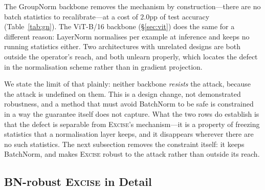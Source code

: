 \documentclass{article}
\newcommand{\ours}{\textsc{Excise}}
\newcommand{\added}[1]{{\color{revised}#1}}
\theoremstyle{remark}
\theoremstyle{plain}
\begin{document}
The GroupNorm backbone removes the mechanism by construction---there are no batch
statistics to recalibrate---at a cost of $2.0$pp of test accuracy
(Table~\ref{tab:gn}). The ViT-B/16 backbone
(\S\ref{sec:vit}) does the same for a different reason: LayerNorm normalises
per example at inference and keeps no running statistics either. Two
architectures with unrelated designs are both outside the operator's reach, and
both unlearn properly, which locates the defect in the normalisation scheme
rather than in gradient projection.

We state the limit of that plainly: neither backbone \emph{resists} the attack,
because the attack is undefined on them. This is a design change, not
demonstrated robustness, and a method that must avoid BatchNorm to be safe is
constrained in a way the guarantee itself does not capture. What the two rows do
establish is that the defect is separable from \ours{}'s mechanism---it is a
property of freezing statistics that a normalisation layer keeps, and it
disappears wherever there are no such statistics. \added{The next subsection
removes the constraint itself: it keeps BatchNorm, and makes \ours{} robust to
the attack rather than outside its reach.}

\begingroup\color{revised}%
\subsection{BN-robust \ours{} in Detail}\label{app:bn_robust}
\end{document}
